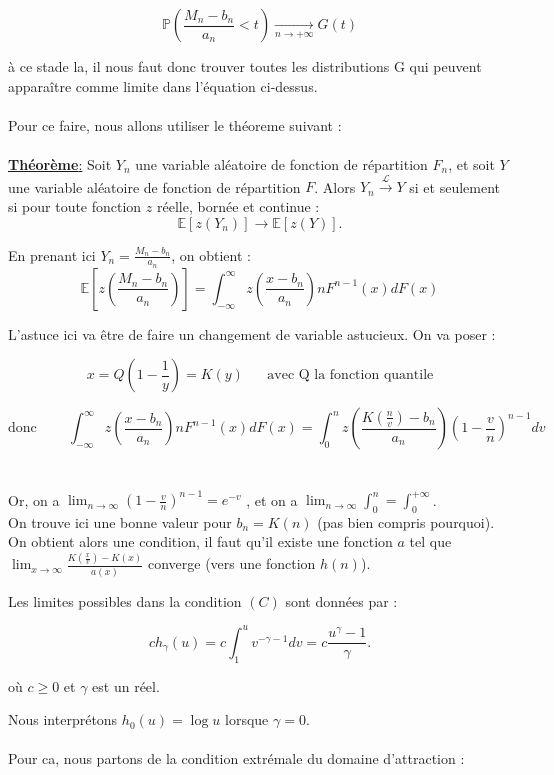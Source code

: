 \documentclass{article}
\begin{document}
\[
\mathbb{P} \left( \frac{M_n - b_n}{a_n} < t \right) \xrightarrow[n\to +\infty]{} G(t)
\]

à ce stade la, il nous faut donc trouver toutes les distributions G qui peuvent apparaître comme limite dans l’équation ci-dessus.
\\
\\
Pour ce faire, nous allons utiliser le théoreme suivant : 
\\
\\
\underline{\textbf{Théorème}:}
Soit \( Y_n \) une variable aléatoire de fonction de répartition \( F_n \), et soit \( Y \) une variable aléatoire de fonction de répartition \( F \).  
Alors $Y_n \xrightarrow{\mathcal{L} } Y$ si et seulement si pour toute fonction $z$ réelle, bornée et continue :
\[
\mathbb{E}[z(Y_n)] \to \mathbb{E}[z(Y)].
\]

En prenant ici $Y_n = \frac{M_n -b_n}{a_n}$, on obtient :
\[
\mathbb{E}[z(\frac{M_n -b_n}{a_n})] = \int_{-\infty}^{\infty} z(\frac{x-b_n}{a_n}) n F^{n-1} (x)dF(x)
\]

L'astuce ici va être de faire un changement de variable astucieux. On va poser : 

\[
x = Q(1-\frac{1}{y}) = K(y) \; \; \; \; \; \; \text{avec Q la fonction quantile}
\]

\[
\text{donc} \;\;\;\;\;\;\;\; \int_{-\infty}^{\infty} z(\frac{x-b_n}{a_n}) n F^{n-1} (x)dF(x) = \int_{0}^{n} z(\frac{K(\frac{n}{v}) - b_n}{a_n}) ( 1 - \frac{v}{n})^{n-1} dv
\]
\\
\\
Or, on a $\lim_{n \to \infty} ( 1 - \frac{v}{n})^{n-1} = e^{-v}$ , et on a $\lim_{n \to \infty} \int_{0}^{n} = \int_{0}^{+ \infty}$.
\\
On trouve ici une bonne valeur pour $b_n = K(n)$ (pas bien compris pourquoi).
\\
On obtient alors une condition, il faut qu'il existe une fonction $a$ tel que $\lim_{x \to \infty} \frac{K(\frac{x}{v}) - K(x)}{a(x)}$ converge (vers une fonction $h(n)$).

Les limites possibles dans la condition \( (C) \) sont données par :

\[
ch_\gamma (u) = c \int_1^u v^{-\gamma - 1} dv = c \frac{u^\gamma - 1}{\gamma}.
\]

où \( c \geq 0 \) et \( \gamma \) est un réel.

Nous interprétons \( h_0 (u) = \log u \) lorsque \( \gamma = 0 \).
\\
\\
Pour ca, nous partons de la condition extrémale du domaine d’attraction :
\end{document}
